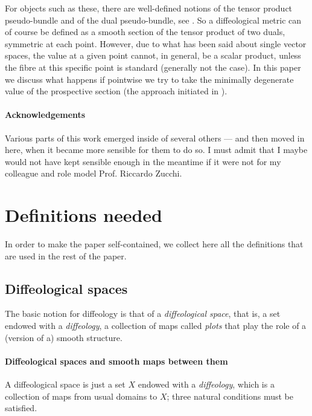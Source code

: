 \documentclass{article}
\begin{document}
For objects such as these, there are well-defined notions of the tensor product pseudo-bundle and of the dual pseudo-bundle, see \cite{vincent}. So a diffeological metric can of course be defined as a smooth 
section of the tensor product of two duals, symmetric at each point. However, due to what has been said about single vector spaces, the value at a given point cannot, in general, be a scalar product, unless 
the fibre at this specific point is standard (generally not the case). In this paper we discuss what happens if pointwise we try to take the minimally degenerate value of the prospective section (the approach 
initiated in \cite{pseudobundles}).

\paragraph{Acknowledgements} Various parts of this work emerged inside of several others --- and then moved in here, when it became more sensible for them to do so. I must admit that I maybe would not
have kept sensible enough in the meantime if it were not for my colleague and role model Prof. Riccardo Zucchi.



\section{Definitions needed}

In order to make the paper self-contained, we collect here all the definitions that are used in the rest of the paper.

\subsection{Diffeological spaces}

The basic notion for diffeology is that of a \emph{diffeological space}, that is, a set endowed with a \emph{diffeology}, a collection of maps called \emph{plots} that play the role of a (version of a) smooth 
structure.

\paragraph{Diffeological spaces and smooth maps between them} A diffeological space is just a set $X$ endowed with a \emph{diffeology}, which is a collection of maps from usual domains to $X$; three 
natural conditions must be satisfied.
\end{document}
